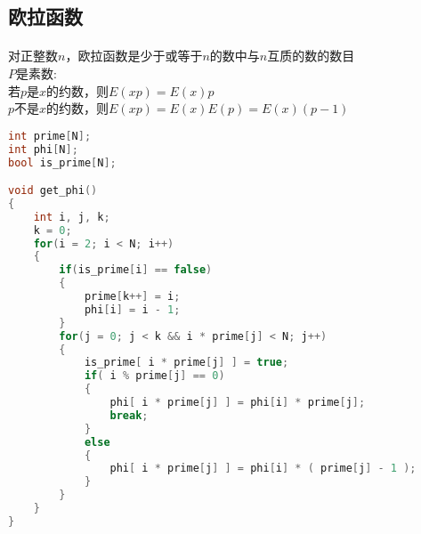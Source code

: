 ﻿\subsection{欧拉函数}
\paragraph{}
对正整数$n$，欧拉函数是少于或等于$n$的数中与$n$互质的数的数目 \\
$P$是素数:\\
若$p$是$x$的约数，则$ E(x p)=E(x)p $ \\
$p$不是$x$的约数，则$ E(x p)=E(x)E(p)=E(x)(p-1) $ \\
    \begin{lstlisting}[language=C++]
int prime[N];
int phi[N];
bool is_prime[N];

void get_phi()
{
    int i, j, k;
    k = 0;
    for(i = 2; i < N; i++)
    {
        if(is_prime[i] == false)
        {
            prime[k++] = i;
            phi[i] = i - 1;
        }
        for(j = 0; j < k && i * prime[j] < N; j++)
        {
            is_prime[ i * prime[j] ] = true;
            if( i % prime[j] == 0)
            {
                phi[ i * prime[j] ] = phi[i] * prime[j];
                break;
            }
            else
            {
                phi[ i * prime[j] ] = phi[i] * ( prime[j] - 1 );
            }
        }
    }
}
\end{lstlisting}
